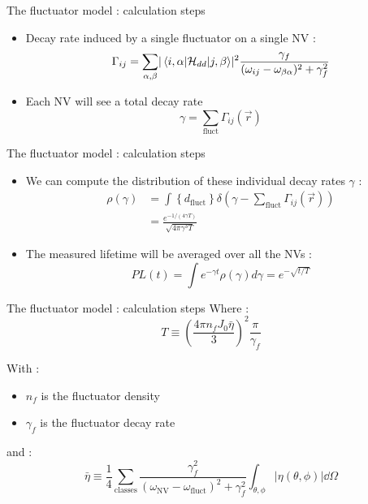 \documentclass{beamer}
\begin{document}
\begin{frame}{The fluctuator model : calculation steps}
\begin{itemize}
\item Decay rate induced by a single fluctuator on a single NV : $$
\Gamma_{ij}=\sum_{\alpha,\beta} \lvert \matrixel{i,\alpha}{\mathcal{H}_{dd}}{j,\beta} \rvert ^2 \frac{\gamma_f}{(\omega_{ij}-\omega_{\beta \alpha})^2 + \gamma_f^2}
$$
\pause
\item Each NV will see a total decay rate $$\gamma = \sum_\mathrm{fluct} \Gamma_{ij}(\vec r)$$
\end{itemize}
\end{frame}
\begin{frame}{The fluctuator model : calculation steps}
\begin{itemize}
\item We can compute the distribution of these individual decay rates $\gamma$ :
\begin{align*}
\rho(\gamma)&=\int \left\{ d_{\mathrm{fluct}} \right\} \delta \left( \gamma - \sum_\mathrm{fluct} \Gamma_{ij}(\vec r) \right) \\
&=\frac{e^{-1/(4\gamma T)}}{\sqrt{4 \pi \gamma^3 T}}
\end{align*}


\pause
\item The measured lifetime will be averaged over all the NVs :
$$
PL(t) = \int e^{-\gamma t} \rho(\gamma) d\gamma = e^{-\sqrt{t/T}}
$$
\end{itemize}
\end{frame}
\begin{frame}{The fluctuator model : calculation steps}
Where :
$$
T \equiv \left( \frac{4 \pi n_f J_0 \bar \eta}{3} \right) ^2 \frac{\pi}{\gamma_f}
$$

With :
\begin{itemize}
\item $n_f$ is the fluctuator density
\item $\gamma_f$ is the fluctuator decay rate
\end{itemize}

and :
$$
 \bar \eta \equiv \frac{1}{4} \sum_{\mathrm{classes}} \frac{\gamma_f^2}{(\omega_{\mathrm{NV}}-\omega_{\mathrm{fluct}})^2 + \gamma_f^2} \int_{\theta , \phi} \lvert \eta(\theta , \phi) \rvert \dd \Omega 
$$
\end{frame}
\end{document}
